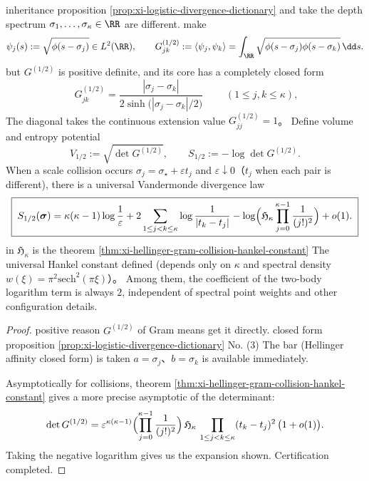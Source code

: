 \begin{proposition}\label{prop:xi-logistic-hellinger-gram-determinant}
inheritance proposition \ref{prop:xi-logistic-divergence-dictionary} and take the depth spectrum \(\sigma_1,\dots,\sigma_\kappa\in\RR\) are different.
make
\[
\psi_j(s):=\sqrt{\phi(s-\sigma_j)}\in L^2(\RR),
\qquad
G^{(1/2)}_{jk}:=\langle \psi_j,\psi_k\rangle=\int_{\RR}\sqrt{\phi(s-\sigma_j)\phi(s-\sigma_k)}\,\dd s.
\]
but \(G^{(1/2)}\) is positive definite, and its core has a completely closed form
\[
\boxed{\;
G^{(1/2)}_{jk}=\frac{|\sigma_j-\sigma_k|}{2\sinh\!\bigl(|\sigma_j-\sigma_k|/2\bigr)}\;}
\qquad(1\le j,k\le\kappa),
\]
The diagonal takes the continuous extension value \(G^{(1/2)}_{jj}=1\)。
Define volume and entropy potential
\[
V_{1/2}:=\sqrt{\det G^{(1/2)}},
\qquad
S_{1/2}:=-\log\det G^{(1/2)}.
\]
When a scale collision occurs \(\sigma_j=\sigma_\star+\varepsilon t_j\) and \(\varepsilon\downarrow 0\)（\(t_j\) when each pair is different), there is a universal Vandermonde divergence law
\[
\boxed{\;
S_{1/2}(\boldsymbol{\sigma})
=\kappa(\kappa-1)\log\frac{1}{\varepsilon}
+2\sum_{1\le j<k\le \kappa}\log\frac{1}{|t_k-t_j|}
-\log\Bigl(\mathfrak H_\kappa\prod_{j=0}^{\kappa-1}\frac{1}{(j!)^{2}}\Bigr)
+o(1).\;}
\]
in \(\mathfrak H_\kappa\) is the theorem \ref{thm:xi-hellinger-gram-collision-hankel-constant} The universal Hankel constant defined (depends only on \(\kappa\) and spectral density \(w(\xi)=\pi^2\mathrm{sech}^2(\pi\xi)\)）。
Among them, the coefficient of the two-body logarithm term is always \(2\), independent of spectral point weights and other configuration details.
\end{proposition}
\begin{proof}
positive reason \(G^{(1/2)}\) of Gram means get it directly.
closed form proposition \ref{prop:xi-logistic-divergence-dictionary} No. \textup{(3)} The bar (Hellinger affinity closed form) is taken \(a=\sigma_j\)、\(b=\sigma_k\) is available immediately.
\par
Asymptotically for collisions, theorem \ref{thm:xi-hellinger-gram-collision-hankel-constant} gives a more precise asymptotic of the determinant:
\[
\det G^{(1/2)}
=\varepsilon^{\kappa(\kappa-1)}
\Bigl(\prod_{j=0}^{\kappa-1}\frac{1}{(j!)^{2}}\Bigr)\,
\mathfrak H_\kappa\,
\prod_{1\le j<k\le\kappa}(t_k-t_j)^{2}\,\bigl(1+o(1)\bigr).
\]
Taking the negative logarithm gives us the expansion shown. Certification completed.
\end{proof}

